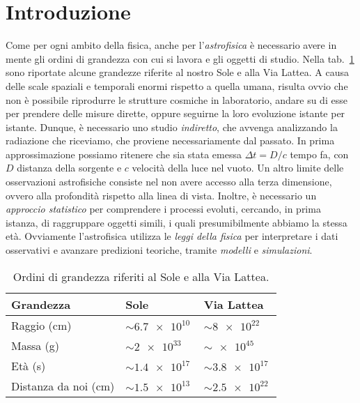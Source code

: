 \section{Introduzione}\label{sec:introduzione}
Come per ogni ambito della fisica, anche per l'\emph{astrofisica} è necessario avere in mente gli ordini di grandezza con cui si lavora e gli oggetti di studio. Nella tab.~\ref{tab:ordini-grandezza-sole-vialattea} sono riportate alcune grandezze riferite al nostro Sole e alla Via Lattea. A causa delle scale spaziali e temporali enormi rispetto a quella umana, risulta ovvio che non è possibile riprodurre le strutture cosmiche in laboratorio, andare su di esse per prendere delle misure dirette, oppure seguirne la loro evoluzione istante per istante. Dunque, è necessario uno studio \emph{indiretto}, che avvenga analizzando la radiazione che riceviamo, che proviene necessariamente dal passato. In prima approssimazione possiamo ritenere che sia stata emessa $\Delta t = D / c$ tempo fa, con $D$ distanza della sorgente e $c$ velocità della luce nel vuoto. Un altro limite delle osservazioni astrofisiche consiste nel non avere accesso alla terza dimensione, ovvero alla profondità rispetto alla linea di vista. Inoltre, è necessario un \emph{approccio statistico} per comprendere i processi evoluti, cercando, in prima istanza, di raggruppare oggetti simili, i quali presumibilmente abbiamo la stessa età. Ovviamente l'astrofisica utilizza le \emph{leggi della fisica} per interpretare i dati osservativi e avanzare predizioni teoriche, tramite \emph{modelli} e \emph{simulazioni}.

\begin{table}
    \caption{Ordini di grandezza riferiti al Sole e alla Via Lattea.}
    \label{tab:ordini-grandezza-sole-vialattea}
    \centering
    \begin{tabular}{lll}
    \toprule
    Grandezza & Sole & Via Lattea  \\
    \midrule
    Raggio (\si{cm}) & $\sim \SI{6.7e10}{}$ & $\sim \SI{8e22}{}$ \\
    Massa (\si{g}) & $\sim \SI{2e33}{}$    & $\sim \SI{e45}{}$    \\
    Età (\si{s}) & $\sim \SI{1.4e17}{}$  & $\sim \SI{3.8e17}{}$  \\
    Distanza da noi (\si{cm}) & $\sim \SI{1.5e13}{}$  & $\sim \SI{2.5e22}{}$  \\
    \bottomrule
    \end{tabular}
\end{table}